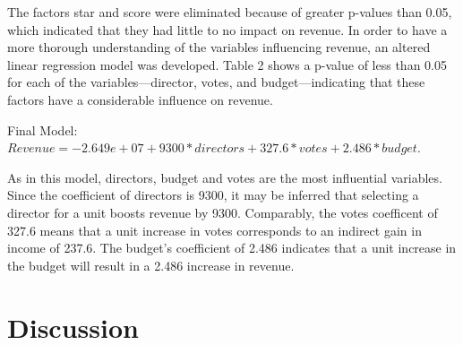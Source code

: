 \documentclass[12pt]{article}
\begin{document}
The factors star and score were eliminated because of greater p-values than 0.05, 
which indicated that they had little to no impact on revenue. In order to have a 
more thorough understanding of the variables influencing revenue, an altered linear 
regression model was developed. Table 2 shows a p-value of less than 0.05 for each 
of the variables—director, votes, and budget—indicating that these factors have a
considerable influence on revenue.


Final Model: 
$Revenue = -2.649e+07 +9300*directors + 327.6*votes + 2.486*budget$.


As in this model, directors, budget and votes are the most influential variables.
Since the coefficient of directors is 9300, it may be inferred that selecting a 
director for a unit boosts revenue by 9300. Comparably, the votes coefficent of 
327.6 means that a unit increase in votes corresponds to an indirect gain in income 
of 237.6. The budget's coefficient of 2.486 indicates that a unit increase in the 
budget will result in a 2.486 increase in revenue.


\section{Discussion}
\label{sec:dis}





\end{document}

